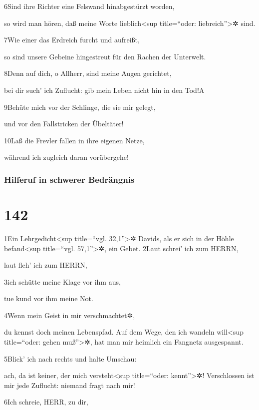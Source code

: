 6Sind ihre Richter eine Felswand hinabgestürzt worden,

so wird man hören, daß meine Worte lieblich\textless sup title=``oder:
liebreich''\textgreater✲ sind.

7Wie einer das Erdreich furcht und aufreißt,

so sind unsere Gebeine hingestreut für den Rachen der Unterwelt.

8Denn auf dich, o Allherr, sind meine Augen gerichtet,

bei dir such' ich Zuflucht: gib mein Leben nicht hin in den Tod!{A}

9Behüte mich vor der Schlinge, die sie mir gelegt,

und vor den Fallstricken der Übeltäter!

10Laß die Frevler fallen in ihre eigenen Netze,

während ich zugleich daran vorübergehe!

\hypertarget{hilferuf-in-schwerer-bedruxe4ngnis}{%
\subsubsection{Hilferuf in schwerer
Bedrängnis}\label{hilferuf-in-schwerer-bedruxe4ngnis}}

\hypertarget{section-141}{%
\section{142}\label{section-141}}

1Ein Lehrgedicht\textless sup title=``vgl. 32,1''\textgreater✲ Davids,
als er sich in der Höhle befand\textless sup title=``vgl.
57,1''\textgreater✲, ein Gebet. 2Laut schrei' ich zum HERRN,

laut fleh' ich zum HERRN,

3ich schütte meine Klage vor ihm aus,

tue kund vor ihm meine Not.

4Wenn mein Geist in mir verschmachtet✲,

du kennst doch meinen Lebenspfad. Auf dem Wege, den ich wandeln
will\textless sup title=``oder: gehen muß''\textgreater✲, hat man mir
heimlich ein Fangnetz ausgespannt.

5Blick' ich nach rechts und halte Umschau:

ach, da ist keiner, der mich versteht\textless sup title=``oder:
kennt''\textgreater✲! Verschlossen ist mir jede Zuflucht: niemand fragt
nach mir!

6Ich schreie, HERR, zu dir,

